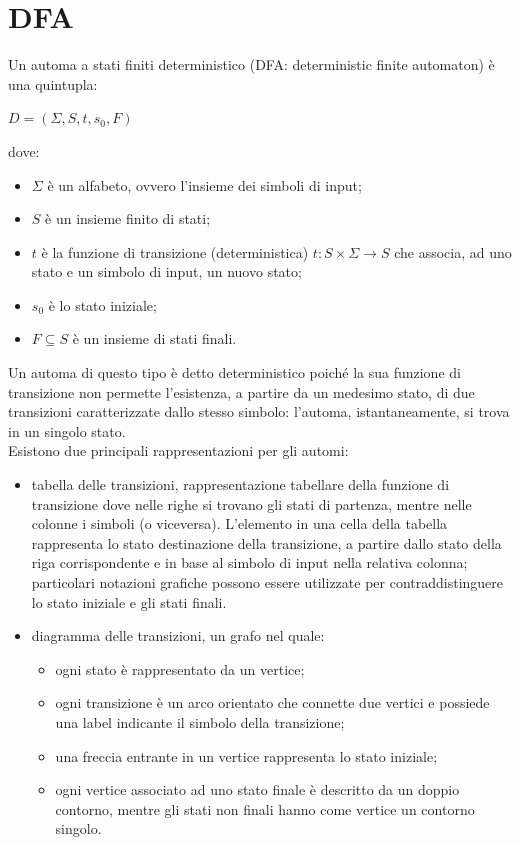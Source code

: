 \section{DFA}
Un automa a stati finiti deterministico (DFA: deterministic finite automaton) è una quintupla:
\begin{center}
	$D = (\Sigma,S,t,s_0,F)$
\end{center}
dove:
\begin{itemize}
\item $\Sigma$ è un alfabeto, ovvero l'insieme dei simboli di input;
\item $S$ è un insieme finito di stati;
\item $t$ è la funzione di transizione (deterministica) $t: S \times \Sigma \rightarrow S$ che associa, ad uno stato e un simbolo di input, un nuovo stato;
\item $s_0$ è lo stato iniziale;
\item $F \subseteq S$ è un insieme di stati finali.
\end{itemize}
Un automa di questo tipo è detto deterministico poiché la sua funzione di transizione non permette l'esistenza, a partire da un medesimo stato, di due transizioni caratterizzate dallo stesso simbolo: l'automa, istantaneamente, si trova in un singolo stato.\\
Esistono due principali rappresentazioni per gli automi:
\begin{itemize}
\item tabella delle transizioni, rappresentazione tabellare della funzione di transizione dove nelle righe si trovano gli stati di partenza, mentre nelle colonne i simboli (o viceversa). L'elemento in una cella della tabella rappresenta lo stato destinazione della transizione, a partire dallo stato della riga corrispondente e in base al simbolo di input nella relativa colonna; particolari notazioni grafiche possono essere utilizzate per contraddistinguere lo stato iniziale e gli stati finali.
\item diagramma delle transizioni, un grafo nel quale:
	\begin{itemize}
	\item ogni stato è rappresentato da un vertice;
	\item ogni transizione è un arco orientato che connette due vertici e possiede una label indicante il simbolo della transizione;
	\item una freccia entrante in un vertice rappresenta lo stato iniziale;
	\item ogni vertice associato ad uno stato finale è descritto da un doppio contorno, mentre gli stati non finali hanno come vertice un contorno singolo.
	\end{itemize}
\end{itemize}

